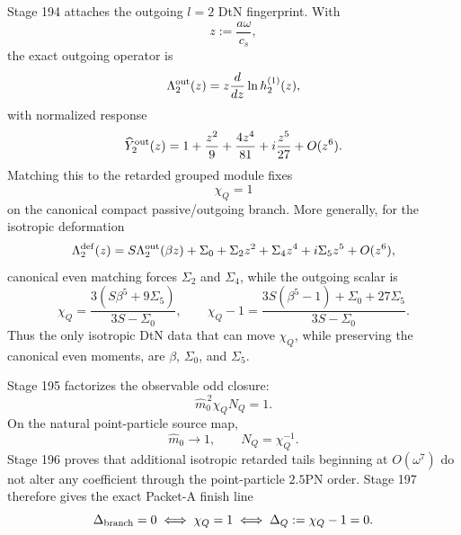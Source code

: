 Stage 194 attaches the outgoing \(l=2\) DtN fingerprint.  With
\begin{equation}
\label{eq:part05-z-def}
z:=\frac{a\omega}{c_s},
\end{equation}
the exact outgoing operator is
\begin{equation}
\label{eq:part05-Lambda-out}
\Lambda_2^{\rm out}(z)
=
z\frac{d}{dz}\ln h_2^{(1)}(z),
\end{equation}
with normalized response
\begin{equation}
\label{eq:part05-Y2-out-fingerprint}
\widehat Y_2^{\rm out}(z)
=
1+\frac{z^2}{9}+\frac{4z^4}{81}+i\frac{z^5}{27}+O(z^6).
\end{equation}
Matching this to the retarded grouped module fixes
\begin{equation}
\label{eq:part05-chiQ-canonical}
\chi_Q=1
\end{equation}
on the canonical compact passive/outgoing branch.  More generally, for the isotropic deformation
\begin{equation}
\label{eq:part05-DtN-deformation}
\Lambda_2^{\rm def}(z)
=
S\Lambda_2^{\rm out}(\beta z)+\Sigma_0+\Sigma_2z^2+\Sigma_4z^4+i\Sigma_5z^5+O(z^6),
\end{equation}
canonical even matching forces \(\Sigma_2\) and \(\Sigma_4\), while the outgoing scalar is
\begin{equation}
\label{eq:part05-chiQ-deformation}
\chi_Q
=
\frac{3(S\beta^5+9\Sigma_5)}{3S-\Sigma_0},
\qquad
\chi_Q-1=
\frac{3S(\beta^5-1)+\Sigma_0+27\Sigma_5}{3S-\Sigma_0}.
\end{equation}
Thus the only isotropic DtN data that can move \(\chi_Q\), while preserving the canonical even moments, are \(\beta\), \(\Sigma_0\), and \(\Sigma_5\).

Stage 195 factorizes the observable odd closure:
\begin{equation}
\label{eq:part05-source-outgoing-factorization}
\widehat m_0^{\,2}\chi_QN_Q=1.
\end{equation}
On the natural point-particle source map,
\begin{equation}
\label{eq:part05-natural-source-map}
\widehat m_0\to1,
\qquad
N_Q=\chi_Q^{-1}.
\end{equation}
Stage 196 proves that additional isotropic retarded tails beginning at \(O(\omega^7)\) do not alter any coefficient through the point-particle \(2.5\)PN order.  Stage 197 therefore gives the exact Packet-A finish line
\begin{equation}
\label{eq:part05-packetA-finish-line}
\Delta_{\rm branch}=0
\iff
\chi_Q=1
\iff
\Delta_Q:=\chi_Q-1=0.
\end{equation}


